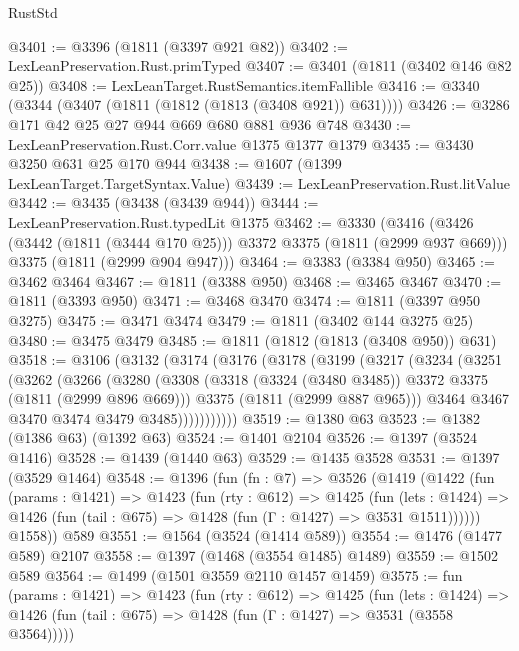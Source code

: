 \begin{lexlean}{RustStd}
\begin{coremodule}
@3401 := @3396 (@1811 (@3397 @921 @82))
@3402 := LexLeanPreservation.Rust.primTyped
@3407 := @3401 (@1811 (@3402 @146 @82 @25))
@3408 := LexLeanTarget.RustSemantics.itemFallible
@3416 := @3340 (@3344 (@3407 (@1811 (@1812 (@1813 (@3408 @921)) @631))))
@3426 := @3286 @171 @42 @25 @27 @944 @669 @680 @881 @936 @748
@3430 := LexLeanPreservation.Rust.Corr.value @1375 @1377 @1379
@3435 := @3430 @3250 @631 @25 @170 @944
@3438 := @1607 (@1399 LexLeanTarget.TargetSyntax.Value)
@3439 := LexLeanPreservation.Rust.litValue
@3442 := @3435 (@3438 (@3439 @944))
@3444 := LexLeanPreservation.Rust.typedLit @1375
@3462 := @3330
    (@3416
      (@3426 (@3442 (@1811 (@3444 @170 @25))) @3372 @3375 (@1811 (@2999 @937 @669)))
      @3375
      (@1811 (@2999 @904 @947)))
@3464 := @3383 (@3384 @950)
@3465 := @3462 @3464
@3467 := @1811 (@3388 @950)
@3468 := @3465 @3467
@3470 := @1811 (@3393 @950)
@3471 := @3468 @3470
@3474 := @1811 (@3397 @950 @3275)
@3475 := @3471 @3474
@3479 := @1811 (@3402 @144 @3275 @25)
@3480 := @3475 @3479
@3485 := @1811 (@1812 (@1813 (@3408 @950)) @631)
@3518 := @3106
    (@3132
      (@3174
        (@3176
          (@3178
            (@3199
              (@3217
                (@3234
                  (@3251
                    (@3262
                      (@3266
                        (@3280
                          (@3308
                            (@3318 (@3324 (@3480 @3485)) @3372 @3375 (@1811 (@2999 @896 @669)))
                            @3375
                            (@1811 (@2999 @887 @965)))
                          @3464
                          @3467
                          @3470
                          @3474
                          @3479
                          @3485)))))))))))
@3519 := @1380 @63
@3523 := @1382 (@1386 @63) (@1392 @63)
@3524 := @1401 @2104
@3526 := @1397 (@3524 @1416)
@3528 := @1439 (@1440 @63)
@3529 := @1435 @3528
@3531 := @1397 (@3529 @1464)
@3548 := @1396
    (fun (fn : @7) =>
    @3526
      (@1419
        (@1422
          (fun (params : @1421) =>
          @1423
            (fun (rty : @612) =>
            @1425
              (fun (lets : @1424) =>
              @1426 (fun (tail : @675) => @1428 (fun (Γ : @1427) => @3531 @1511))))))
        @1558))
    @589
@3551 := @1564 (@3524 (@1414 @589))
@3554 := @1476 (@1477 @589) @2107
@3558 := @1397 (@1468 (@3554 @1485) @1489)
@3559 := @1502 @589
@3564 := @1499 (@1501 @3559 @2110 @1457 @1459)
@3575 := fun (params : @1421) =>
  @1423
    (fun (rty : @612) =>
    @1425
      (fun (lets : @1424) =>
      @1426 (fun (tail : @675) => @1428 (fun (Γ : @1427) => @3531 (@3558 @3564)))))

\end{coremodule}
\end{lexlean}

